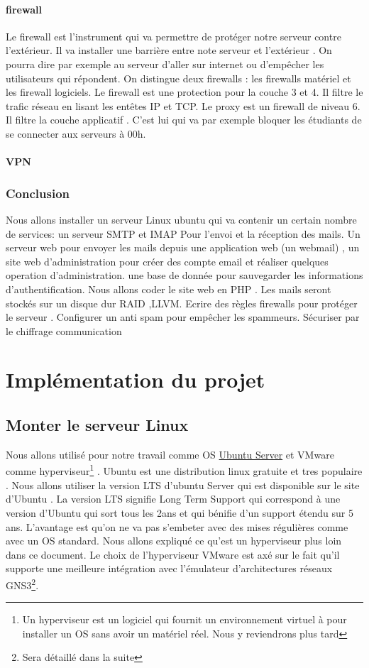 \documentclass[a4paper,12pt,french]{report} %
\begin{document}
\subsubsection{firewall}
Le firewall est l'instrument qui va permettre de protéger notre serveur contre l'extérieur. Il va installer une barrière entre note serveur et l'extérieur . On pourra dire par exemple au serveur d'aller sur internet ou d'empêcher les utilisateurs qui répondent. On distingue deux firewalls : les firewalls matériel et les firewall logiciels. Le firewall est une protection pour la couche 3 et 4. Il filtre le trafic réseau en lisant les entêtes IP et TCP.
Le proxy est un firewall de niveau 6. Il filtre la couche applicatif . C'est lui qui va par exemple bloquer les étudiants de se connecter aux serveurs à 00h.
\subsubsection{VPN}

\subsection*{Conclusion}
Nous allons installer un serveur Linux ubuntu qui va contenir un certain nombre de services:
un serveur SMTP et IMAP Pour l'envoi et la réception des mails. 
Un serveur web pour envoyer les mails depuis une application web (un webmail) , un site web d'administration pour créer des compte email et réaliser quelques operation d'administration.  une base de donnée pour sauvegarder les informations d'authentification. Nous allons coder le site web en PHP . Les mails seront stockés sur un disque dur RAID ,LLVM. Ecrire des règles firewalls pour protéger le serveur . Configurer un anti spam pour empêcher les spammeurs. Sécuriser par le chiffrage communication 

\chapter{Implémentation du projet}
\section{Monter le serveur Linux}
Nous allons utilisé pour notre travail comme OS \href{https://ubuntu-fr.org/telechargement?variante=server}{Ubuntu Server} et VMware comme hyperviseur\footnote{Un hyperviseur est un logiciel qui fournit un environnement virtuel à pour installer un OS sans avoir un matériel réel. Nous y reviendrons plus tard} . Ubuntu est une distribution linux gratuite et tres populaire . Nous allons utiliser la version  LTS d'ubuntu Server qui est disponible sur le site d'Ubuntu . La version LTS signifie Long Term Support qui correspond à une version d'Ubuntu qui sort tous les 2ans et qui bénifie d'un support étendu sur 5 ans. L'avantage est qu'on ne va pas s'embeter avec des mises régulières comme avec un OS standard. Nous allons expliqué ce qu'est un hyperviseur plus loin dans ce document. Le choix de l'hyperviseur VMware est axé sur le fait qu'il supporte une meilleure intégration avec l'émulateur d'architectures réseaux GNS3\footnote{Sera détaillé dans la suite}. 
\end{document}
